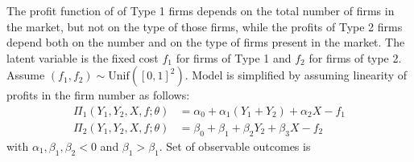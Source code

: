 The profit function of of Type 1 firms depends on the total number of firms in the market, but not on the type of those firms, while the profits of Type 2 firms depend both on the number and on the type of firms present in the market. The latent variable is the fixed cost $f_1$ for firms of Type 1 and $f_2$ for firms of type 2. Assume \((f_1, f_2) \sim \text{Unif}([0,1]^2)\). Model is simplified by assuming linearity of profits in the firm number as follows: 
\begin{align*}
	\Pi_1(Y_1, Y_2, X, f;\theta) &= \alpha_0 + \alpha_1(Y_1 + Y_2) + \alpha_2 X - f_1 \\ 
	\Pi_2(Y_1, Y_2, X, f;\theta) &= \beta_0 + \beta_1 + \beta_2 Y_2 + \beta_3 X - f_2
\end{align*}
with $\alpha_1, \beta_1, \beta_2 < 0$ and $\beta_1 > \beta_1$. Set of observable outcomes is


